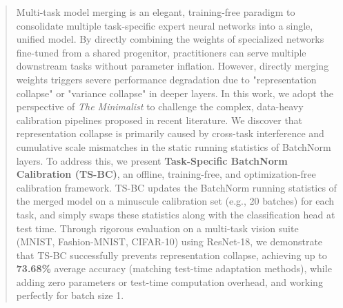 \documentclass{article}
\theoremstyle{plain}
\theoremstyle{definition}
\theoremstyle{remark}
\begin{document}

\printAffiliationsAndNotice{\icmlequalcontrib}

\begin{abstract}
Multi-task model merging is an elegant, training-free paradigm to consolidate multiple task-specific expert neural networks into a single, unified model. By directly combining the weights of specialized networks fine-tuned from a shared progenitor, practitioners can serve multiple downstream tasks without parameter inflation. However, directly merging weights triggers severe performance degradation due to "representation collapse" or "variance collapse" in deeper layers. In this work, we adopt the perspective of \textit{The Minimalist} to challenge the complex, data-heavy calibration pipelines proposed in recent literature. We discover that representation collapse is primarily caused by cross-task interference and cumulative scale mismatches in the static running statistics of BatchNorm layers. To address this, we present \textbf{Task-Specific BatchNorm Calibration (TS-BC)}, an offline, training-free, and optimization-free calibration framework. TS-BC updates the BatchNorm running statistics of the merged model on a minuscule calibration set (e.g., 20 batches) for each task, and simply swaps these statistics along with the classification head at test time. Through rigorous evaluation on a multi-task vision suite (MNIST, Fashion-MNIST, CIFAR-10) using ResNet-18, we demonstrate that TS-BC successfully prevents representation collapse, achieving up to \textbf{73.68\%} average accuracy (matching test-time adaptation methods), while adding zero parameters or test-time computation overhead, and working perfectly for batch size 1.
\end{abstract}
\end{document}
